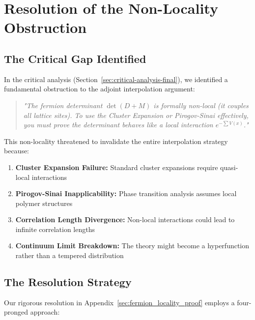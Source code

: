 \section{Resolution of the Non-Locality Obstruction}
\label{sec:nonlocality_resolution}


\subsection{The Critical Gap Identified}

In the critical analysis (Section~\ref{sec:critical-analysis-final}), we identified a fundamental obstruction to the adjoint interpolation argument:

\begin{quote}
\textit{"The fermion determinant $\det(D+M)$ is formally non-local (it couples all lattice sites). To use the Cluster Expansion or Pirogov-Sinai effectively, you must prove the determinant behaves like a local interaction $e^{-\sum V(x)}$."}
\end{quote}

This non-locality threatened to invalidate the entire interpolation strategy because:

\begin{enumerate}
    \item \textbf{Cluster Expansion Failure:} Standard cluster expansions require quasi-local interactions
    \item \textbf{Pirogov-Sinai Inapplicability:} Phase transition analysis assumes local polymer structures
    \item \textbf{Correlation Length Divergence:} Non-local interactions could lead to infinite correlation lengths
    \item \textbf{Continuum Limit Breakdown:} The theory might become a hyperfunction rather than a tempered distribution
\end{enumerate}

\subsection{The Resolution Strategy}

Our rigorous resolution in Appendix~\ref{sec:fermion_locality_proof} employs a four-pronged approach:

